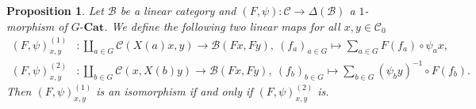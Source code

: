 \documentclass{surv-l}
\numberwithin{equation}{chapter}
\numberwithin{figure}{chapter}
\theoremstyle{plain}
\newtheorem{prp}[thm]{Proposition}
\theoremstyle{definition}
\theoremstyle{remark}
\newcommand{\GCat}{G\text{-}\mathbf{Cat}}
\begin{document}
\begin{prp}
\label{prp:iso-iso}
Let $\mathcal{B}$ be a linear category and
$(F,\psi) \colon{\mathcal{C}}\to \Delta(\mathcal{B})$ a $1$-morphism of $\GCat$.
We define the following two linear maps for all $x,y\in{\mathcal{C}}_0$
\[
\begin{aligned}
(F, \psi)_{x,y}^{(1)} &\colon\coprod_{a\in G}{\mathcal{C}}(X(a)x,y)  \to  \mathcal{B}(Fx,Fy),
\ (f_{a})_{a\in G}\mapsto\sum_{a\in G}F(f_{a})\circ \psi_{a}x,\\
(F, \psi)_{x,y}^{(2)} &\colon\coprod_{b\in G}{\mathcal{C}}(x,X(b)y)  \to  \mathcal{B}(Fx,Fy),
\ (f_{b})_{b\in G}\mapsto\sum_{b\in G}(\psi_{b}y)^{-1} \circ F(f_{b}).
\end{aligned}
\]
Then $(F, \psi)_{x,y}^{(1)}$ is an isomorphism if and only if
$(F, \psi)_{x,y}^{(2)}$ is.
\end{prp}
\end{document}
